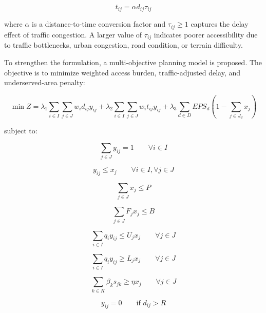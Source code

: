 \begin{equation}
t_{ij} = \alpha d_{ij} \tau_{ij}
\end{equation}

where $\alpha$ is a distance-to-time conversion factor and $\tau_{ij} \geq 1$ captures the delay effect of traffic congestion. A larger value of $\tau_{ij}$ indicates poorer accessibility due to traffic bottlenecks, urban congestion, road condition, or terrain difficulty.

To strengthen the formulation, a multi-objective planning model is proposed. The objective is to minimize weighted access burden, traffic-adjusted delay, and underserved-area penalty:

\begin{equation}
\min Z =
\lambda_1 \sum_{i \in I} \sum_{j \in J} w_i d_{ij} y_{ij}
+
\lambda_2 \sum_{i \in I} \sum_{j \in J} w_i t_{ij} y_{ij}
+
\lambda_3 \sum_{d \in D} EPS_d \left( 1 - \sum_{j \in J_d} x_j \right)
\end{equation}

subject to:

\begin{equation}
\sum_{j \in J} y_{ij} = 1 \qquad \forall i \in I
\end{equation}

\begin{equation}
y_{ij} \leq x_j \qquad \forall i \in I, \forall j \in J
\end{equation}

\begin{equation}
\sum_{j \in J} x_j \leq P
\end{equation}

\begin{equation}
\sum_{j \in J} F_j x_j \leq B
\end{equation}

\begin{equation}
\sum_{i \in I} q_i y_{ij} \leq U_j x_j \qquad \forall j \in J
\end{equation}

\begin{equation}
\sum_{i \in I} q_i y_{ij} \geq L_j x_j \qquad \forall j \in J
\end{equation}

\begin{equation}
\sum_{k \in K} \beta_k s_{jk} \geq \eta x_j \qquad \forall j \in J
\end{equation}

\begin{equation}
y_{ij} = 0 \qquad \text{if } d_{ij} > R
\end{equation}

